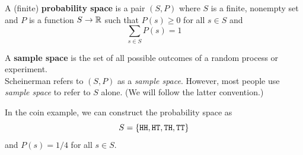 \documentclass[10pt]{beamer}
\begin{document}
\begin{frame}
\small 
\begin{mygreenbox}[title=Definition]
A (finite) \textbf{probability space} is a pair $(S,P)$ where $S$ is a finite, nonempty set and $P$ is a function $S \to \mathbb{R}$ such that $P(s) \geq 0$ for all $s \in S$ and 
\[ \sum_{s \in S} P(s) =1 \] 
\end{mygreenbox}
\vfill 

\pause 
\vfill 

\begin{myredbox}[title=\text{Remark: What is a sample space?}]

A \textbf{sample space} is the set of all possible outcomes of a random process or experiment. \\

Scheinerman refers to $(S,P)$ as a \textit{sample space}.  However, most people  use \textit{sample space} to refer to $S$ alone.  (We will follow the latter convention.)
\end{myredbox}


\pause 
\vfill 

\begin{myyellowbox}[title=Example Of A Probability Space]

In the coin example, we can construct the probability space as 
\[S = \{ {\texttt{HH}, \texttt{HT}, \texttt{TH}, \texttt{TT}} \} \]
and $P(s) = 1/4$ for all $s \in S$.
\end{myyellowbox}

\end{frame}
\end{document}
